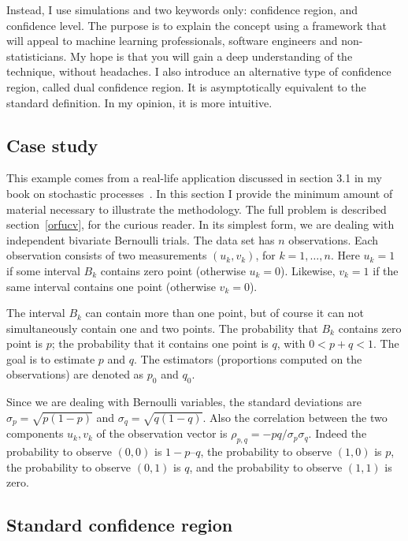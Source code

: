 \documentclass[oneside,10pt]{book}
\begin{document}
Instead, I use simulations and two keywords only: confidence region, and confidence level. The purpose is to explain the concept using a framework that will appeal to machine learning professionals, software engineers and non-statisticians. My hope is that you will gain a deep understanding of the technique, without headaches. I also introduce an alternative type of confidence region, called 
dual confidence region. It is asymptotically equivalent to the standard definition. In my opinion, it is more intuitive.


\subsection{Case study}\label{sdxcxza}

This example comes from a real-life application discussed in section 3.1 in my book on stochastic processes~\cite{vgsimulnew}. In this section I provide the minimum amount of material necessary to illustrate the methodology.
The full problem is described  section~\ref{orfucv}, for the curious reader. In its simplest form, we are dealing with independent \textcolor{index}{bivariate Bernoulli trials}. The data set has $n$ observations. Each observation consists of two measurements 
$(u_k, v_k)$, for $k=1,\dots, n$. Here $u_k = 1$ if some interval $B_k$ contains zero point (otherwise $u_k = 0$).
 Likewise, $v_k = 1$ if the same interval contains one point (otherwise $v_k = 0$).

The interval $B_k$ can contain more than one point, but of course it can not simultaneously contain one and two points. The probability that $B_k$ contains zero point is $p$; the probability that it contains one point is $q$, with $0< p+q <1$. The goal is to estimate $p$ and $q$. The estimators (proportions computed on the observations) are denoted as $p_0$ and $q_0$.

Since we are dealing with Bernoulli variables, the standard deviations are $\sigma_p = \sqrt{p(1-p)}$ and $\sigma_q = \sqrt{q(1-q)}$. Also the correlation between the two components $u_k, v_k$ of the observation vector is $\rho_{p,q} = -pq / \sigma_p \sigma_q$. Indeed the probability to observe $(0, 0)$ is $1-p–q$, the probability to observe $(1, 0)$ is $p$, the probability to observe $(0, 1)$ is $q$, and the probability to observe $(1, 1)$ is zero.

\subsection{Standard confidence region}
\end{document}
